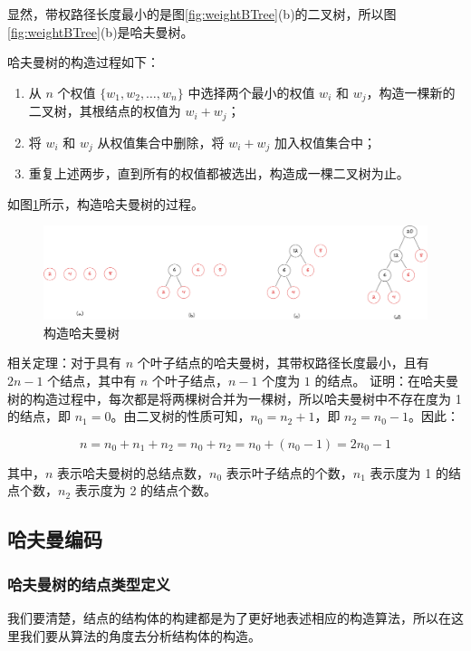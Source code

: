 \documentclass[lang=cn,newtx,10pt,scheme=chinese]{../elegantbook}
\begin{document}
显然，带权路径长度最小的是图\ref{fig:weightBTree}(b)的二叉树，所以图\ref{fig:weightBTree}(b)是哈夫曼树。

哈夫曼树的构造过程如下：

\begin{enumerate}
  \item 从 $n$ 个权值 $\{w_1, w_2, \dots, w_n\}$ 中选择两个最小的权值 $w_i$ 和 $w_j$，构造一棵新的二叉树，其根结点的权值为 $w_i + w_j$；
  \item 将 $w_i$ 和 $w_j$ 从权值集合中删除，将 $w_i + w_j$ 加入权值集合中；
  \item 重复上述两步，直到所有的权值都被选出，构造成一棵二叉树为止。
  \end{enumerate}

如图\ref{fig:HuffmanTree}所示，构造哈夫曼树的过程。

\begin{figure}[!htbp]
  \centering
  \includegraphics[width=1\textwidth]{./figure/pdf/cropped/createHaffman.pdf}
  \caption{构造哈夫曼树}
  \label{fig:HuffmanTree}
\end{figure}

相关定理：对于具有 $n$ 个叶子结点的哈夫曼树，其带权路径长度最小，且有 $2n-1$ 个结点，其中有 $n$ 个叶子结点，$n-1$ 个度为 $1$ 的结点。
证明：在哈夫曼树的构造过程中，每次都是将两棵树合并为一棵树，所以哈夫曼树中不存在度为 1 的结点，即 $n_1 = 0$。由二叉树的性质可知，$n_0 = n_2 + 1$，即 $n_2 = n_0 - 1$。因此：

\[
n = n_0 + n_1 + n_2 = n_0 + n_2 = n_0 + (n_0 - 1) = 2n_0 - 1
\]

其中，$n$ 表示哈夫曼树的总结点数，$n_0$ 表示叶子结点的个数，$n_1$ 表示度为 1 的结点个数，$n_2$ 表示度为 2 的结点个数。

\subsection{哈夫曼编码}
\subsubsection{哈夫曼树的结点类型定义}

我们要清楚，结点的结构体的构建都是为了更好地表述相应的构造算法，所以在这里我们要从算法的角度去分析结构体的构造。
\end{document}
